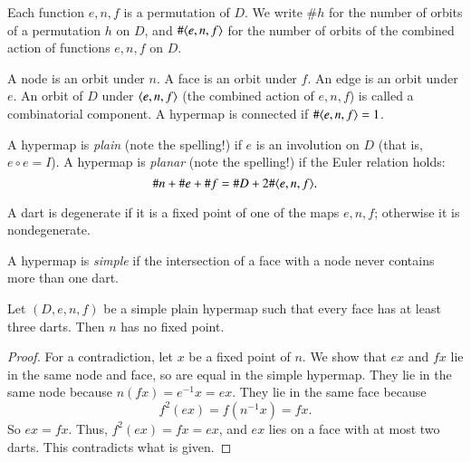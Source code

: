 Each function $e,n,f$ is a permutation of $D$.  
We write $\#h$ for the
number of orbits of a permutation $h$ on $D$, and $\#\langle e,n,f\rangle$
for the number of orbits of the combined action of functions $e,n,f$
on $D$.   

\begin{definition}  A node is an orbit  under
$n$.  A face is an  orbit  under $f$.  An edge
is an orbit under $e$. An orbit of $D$ under $\langle e,n,f\rangle$
(the combined action of $e,n,f$) is called a combinatorial component.
A hypermap is connected
if 
  $\#\langle e,n,f\rangle = 1$. 
\end{definition}

\begin{definition} A hypermap is {\it plain} (note the spelling!) if
$e$ is an involution on $D$ (that is, $e\circ e = I$).  A hypermap
is {\it planar} (note the spelling!) if the Euler relation holds:
    $$\# n + \# e + \# f = \# D + 2 \#\langle e,n,f\rangle.$$
\end{definition}

\begin{definition}[degenerate] A dart is degenerate if it is a
fixed point of one of the maps $e,n,f$; otherwise it is nondegenerate.  
\end{definition}

\begin{definition}[simple] 
A hypermap is {\it simple} if the intersection of a face with
a node never contains more than one dart.
\end{definition}


\begin{lemma} 
Let $(D,e,n,f)$ be a simple plain hypermap such that every face has
at least three darts.
Then $n$ has no fixed point.
\end{lemma}

\begin{proof}  For a contradiction, let $x$ be a fixed point of
$n$. We show that $e x$ and $f x$ lie in the same node and
face, so are equal in the simple hypermap.  
They lie in the same node because
$n(f x) = e^{-1} x = e x$. They lie in the same face because
    $$f^2 (e x) =  f(n^{-1} x) = f x.$$
So $e x = f x$.   Thus, $f^2 (e x) = f x = e x$, and $e x$ lies on a
face with at most two darts.  This contradicts what is given.
\end{proof}

